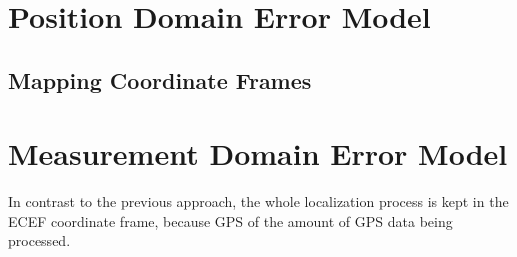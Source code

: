 \section{Position Domain Error Model}

\subsection{Mapping Coordinate Frames}
\label{sec:impl-coordinates}


\section{Measurement Domain Error Model}

In contrast to the previous approach, the whole localization process is kept in
the ECEF coordinate frame, because GPS of the amount of GPS data being processed.

